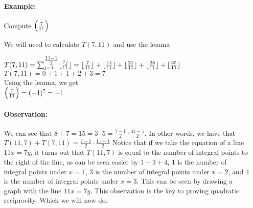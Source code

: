\documentclass[../main.tex]{subfiles}
\begin{document}
\paragraph{Example:} Compute $\Big(\frac{7}{11}\Big)$
\begin{ans}
    We will need to calculate $T(7,11)$ and use the lemma
    \begin{center}
        $T(7, 11)=\sum_{j=1}^{\tfrac{11-1}{2}}\lfloor\tfrac{7j}{11}\rfloor=\lfloor\tfrac{7}{11}\rfloor+\lfloor\tfrac{14}{11}\rfloor+\lfloor\tfrac{21}{11}\rfloor+\lfloor\tfrac{28}{11}\rfloor+\lfloor\tfrac{35}{11}\rfloor$ \\
        $T(7, 11)=0+1+1+2+3=7$ \\
        Using the lemma, we get \\
        $\Big(\frac{7}{11}\Big)=(-1)^7=-1$
    \end{center}
\end{ans}
\paragraph{Observation:} We can see that $8+7=15=3\cdot5=\tfrac{7-1}{2}\cdot \tfrac{11-1}{2}$. In other words, we have that $T(11,7)+T(7,11)=\tfrac{7-1}{2}\cdot \tfrac{11-1}{2}$ \sspace
Notice that if we take the equation of a line $11x=7y$, it turns out that $T(11,7)$ is equal to the number of integral points to the right of the line, as can be seen easier by $1+3+4$, 1 is the number of integral points under $x=1$, 3 is the number of integral points under $x=2$, and 4 is the number of integral points under $x=3$. This can be seen by drawing a graph with the line $11x=7y$. This observation is the key to proving quadratic reciprocity. Which we will now do.
\end{document}
